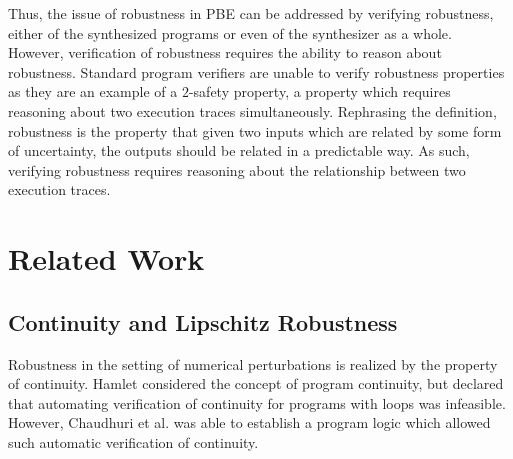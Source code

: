 \documentclass{llncs}
\begin{document}
Thus, the issue of robustness in PBE can be addressed by verifying robustness,
either of the synthesized programs or even of the synthesizer as a whole.
However, verification of robustness requires the ability to reason about
robustness.  Standard program verifiers are unable to verify robustness
properties as they are an example of a \(2\)-safety property, a property which
requires reasoning about two execution traces simultaneously.  Rephrasing the definition,
robustness is the property that given two inputs which are related by some form
of uncertainty, the outputs should be related in a predictable way.  As such,
verifying robustness requires reasoning about the relationship between two
execution traces.

\vspace{-0.1in}
\section{Related Work}

%
%
  \subsection{Continuity and Lipschitz Robustness}
    \space\space Robustness in the setting of numerical perturbations
    is realized by the property of continuity.  Hamlet \cite{hamlet02} considered the
    concept of program continuity, but declared that automating verification of
    continuity for programs with loops was infeasible.  However, Chaudhuri et al.
    \cite{chaudhuri10} was able to establish a program logic which allowed such
    automatic verification of continuity.
    \smallskip
\end{document}
